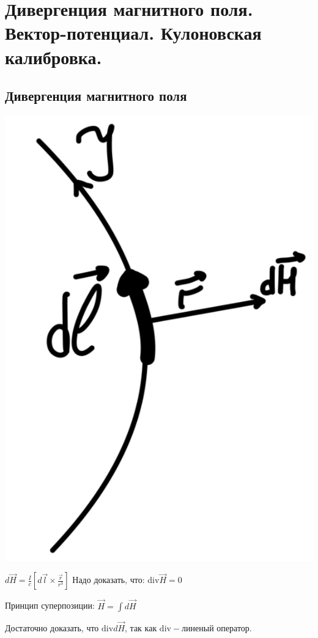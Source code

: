 \section{Дивергенция магнитного поля. Вектор-потенциал. Кулоновская
калибровка.}
 
\subsection*{Дивергенция магнитного поля}

\noindent
\begin{minipage}[c]{0.2\textwidth} %
    \includegraphics[width=\textwidth]{im/62.png}{} %
\end{minipage}%
\hfill
\begin{minipage}[c]{0.68\textwidth} %
    
    \( d\vec{H}=\frac{I}{c}\left[ d\vec{l}\times \frac{\vec{r}}{r^3}  \right] \text{ Надо доказать, что: }\mathrm{div} \vec{H}=0 \)
    
    Принцип суперпозиции: $\vec{H}=\int d\vec{H}$
    
    Достаточно доказать, что $\mathrm{div} d\vec{H}$, так как $\mathrm{div}-$линеный оператор. 
\end{minipage}

